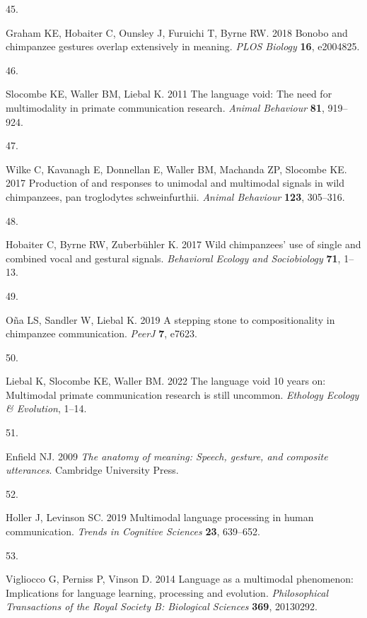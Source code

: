 \documentclass[
  man,floatsintext]{apa6}
\newlength{\cslhangindent}
\newlength{\csllabelwidth}
\newlength{\cslentryspacingunit} %
\newenvironment{CSLReferences}[2] %
 {%
  \setlength{\parindent}{0pt}
  \ifodd #1
  \let\oldpar\par
  \def\par{\hangindent=\cslhangindent\oldpar}
  \fi
  \setlength{\parskip}{#2\cslentryspacingunit}
 }%
 {}
\newcommand{\CSLLeftMargin}[1]{\parbox[t]{\csllabelwidth}{#1}}
\newcommand{\CSLRightInline}[1]{\parbox[t]{\linewidth - \csllabelwidth}{#1}\break}
\begin{document}
\begin{CSLReferences}{0}{0}
\leavevmode{}%
\CSLLeftMargin{45. }
\CSLRightInline{Graham KE, Hobaiter C, Ounsley J, Furuichi T, Byrne RW. 2018 Bonobo and chimpanzee gestures overlap extensively in meaning. \emph{PLOS Biology} \textbf{16}, e2004825.}

\leavevmode{}%
\CSLLeftMargin{46. }
\CSLRightInline{Slocombe KE, Waller BM, Liebal K. 2011 The language void: The need for multimodality in primate communication research. \emph{Animal Behaviour} \textbf{81}, 919--924.}

\leavevmode{}%
\CSLLeftMargin{47. }
\CSLRightInline{Wilke C, Kavanagh E, Donnellan E, Waller BM, Machanda ZP, Slocombe KE. 2017 Production of and responses to unimodal and multimodal signals in wild chimpanzees, pan troglodytes schweinfurthii. \emph{Animal Behaviour} \textbf{123}, 305--316.}

\leavevmode{}%
\CSLLeftMargin{48. }
\CSLRightInline{Hobaiter C, Byrne RW, Zuberbühler K. 2017 Wild chimpanzees' use of single and combined vocal and gestural signals. \emph{Behavioral Ecology and Sociobiology} \textbf{71}, 1--13.}

\leavevmode{}%
\CSLLeftMargin{49. }
\CSLRightInline{Oña LS, Sandler W, Liebal K. 2019 A stepping stone to compositionality in chimpanzee communication. \emph{PeerJ} \textbf{7}, e7623.}

\leavevmode{}%
\CSLLeftMargin{50. }
\CSLRightInline{Liebal K, Slocombe KE, Waller BM. 2022 The language void 10 years on: Multimodal primate communication research is still uncommon. \emph{Ethology Ecology \& Evolution}, 1--14.}

\leavevmode{}%
\CSLLeftMargin{51. }
\CSLRightInline{Enfield NJ. 2009 \emph{The anatomy of meaning: Speech, gesture, and composite utterances}. Cambridge University Press. }

\leavevmode{}%
\CSLLeftMargin{52. }
\CSLRightInline{Holler J, Levinson SC. 2019 Multimodal language processing in human communication. \emph{Trends in Cognitive Sciences} \textbf{23}, 639--652.}

\leavevmode{}%
\CSLLeftMargin{53. }
\CSLRightInline{Vigliocco G, Perniss P, Vinson D. 2014 Language as a multimodal phenomenon: Implications for language learning, processing and evolution. \emph{Philosophical Transactions of the Royal Society B: Biological Sciences} \textbf{369}, 20130292.}


\end{CSLReferences}
\end{document}
